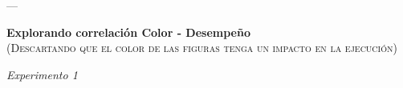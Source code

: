 \documentclass[a4paper ]{article}
\begin{document}
\clearpage
















---
\vspace{3mm}
\begin{center}
{\LARGE \textbf{Explorando correlación Color - Desempeño}}\\
{\small \textsc{(Descartando que el color de las figuras tenga un impacto en la ejecución)}}\\
\smallskip
\end{center}
\begin{center}
{\LARGE \textit{Experimento 1}}\\
\end{center}
\vspace{3mm}
\end{document}
